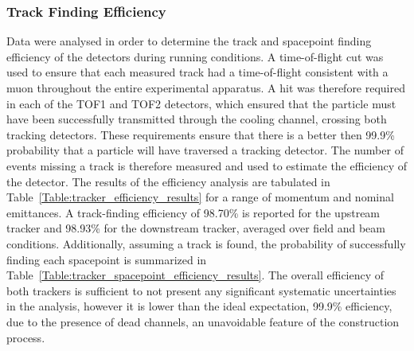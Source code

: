 \subsubsection{Track Finding Efficiency}
\label{trackers:performance:efficiency}
Data were analysed in order to determine the track and spacepoint finding efficiency of the detectors during running conditions. A time-of-flight cut was used to ensure that each measured track had a time-of-flight consistent with a muon throughout the entire experimental apparatus. A hit was therefore required in each of the TOF1 and TOF2 detectors, which ensured that the particle must have been successfully transmitted through the cooling channel, crossing both tracking detectors. These requirements ensure that there is a better then 99.9\% probability that a particle will have traversed a tracking detector.
The number of events missing a track is therefore measured and used to estimate the efficiency of the detector.
The results of the efficiency analysis are tabulated in Table~\ref{Table:tracker_efficiency_results} for a range of momentum and nominal emittances. A track-finding efficiency of 98.70\% is reported for the upstream tracker and 98.93\% for the downstream tracker, averaged over field and beam conditions. Additionally, assuming a track is found, the probability of successfully finding each spacepoint is summarized in Table~\ref{Table:tracker_spacepoint_efficiency_results}. The overall efficiency of both trackers is sufficient to not present any significant systematic uncertainties in the analysis, however it is lower than the ideal expectation, 99.9\% efficiency, due to the presence of dead channels, an unavoidable feature of the construction process.

